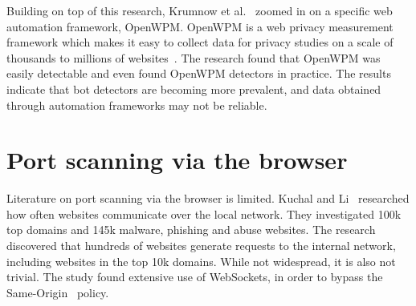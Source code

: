 Building on top of this research, Krumnow et al.~ zoomed in on a specific web automation framework, OpenWPM. OpenWPM is a web privacy measurement framework which makes it easy to collect data for privacy studies on a scale of thousands to millions of websites~. The research found that OpenWPM was easily detectable and even found OpenWPM detectors in practice. The results indicate that bot detectors are becoming more prevalent, and data obtained through automation frameworks may not be reliable.





\section{Port scanning via the browser}

Literature on port scanning via the browser is limited. Kuchal and Li~ researched how often websites communicate over the local network. They investigated 100k top domains and 145k malware, phishing and abuse websites. The research discovered that hundreds of websites generate requests to the internal network, including websites in the top 10k domains. While not widespread, it is also not trivial. The study found extensive use of WebSockets, in order to bypass the Same-Origin~ policy.

